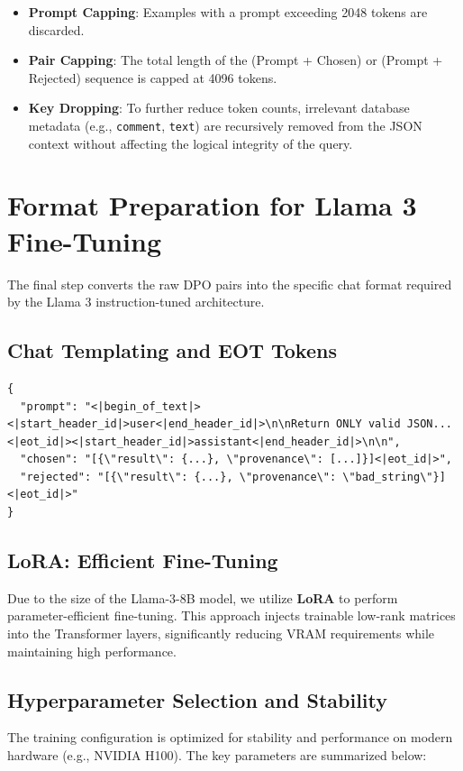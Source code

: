 \documentclass{article}
\begin{document}
\begin{itemize}
    \item \textbf{Prompt Capping}: Examples with a prompt exceeding 2048 tokens are discarded.
    \item \textbf{Pair Capping}: The total length of the (Prompt + Chosen) or (Prompt + Rejected) sequence is capped at 4096 tokens.
    \item \textbf{Key Dropping}: To further reduce token counts, irrelevant database metadata (e.g., \texttt{comment}, \texttt{text}) are recursively removed from the JSON context without affecting the logical integrity of the query.
\end{itemize}



\section{Format Preparation for Llama 3 Fine-Tuning}
The final step converts the raw DPO pairs into the specific chat format required by the Llama 3 instruction-tuned architecture.

\subsection{Chat Templating and EOT Tokens}

\begin{lstlisting}[caption=Example of a Formatted DPO Record]
{
  "prompt": "<|begin_of_text|><|start_header_id|>user<|end_header_id|>\n\nReturn ONLY valid JSON... <|eot_id|><|start_header_id|>assistant<|end_header_id|>\n\n",
  "chosen": "[{\"result\": {...}, \"provenance\": [...]}]<|eot_id|>",
  "rejected": "[{\"result\": {...}, \"provenance\": \"bad_string\"}]<|eot_id|>"
}
\end{lstlisting}

\subsection{LoRA: Efficient Fine-Tuning}
Due to the size of the Llama-3-8B model, we utilize \textbf{LoRA} to perform parameter-efficient fine-tuning. This approach injects trainable low-rank matrices into the Transformer layers, significantly reducing VRAM requirements while maintaining high performance.



\subsection{Hyperparameter Selection and Stability}
The training configuration is optimized for stability and performance on modern hardware (e.g., NVIDIA H100). The key parameters are summarized below:
\end{document}
